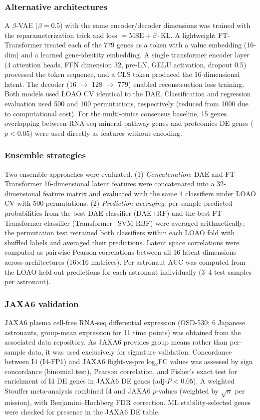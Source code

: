 \documentclass[11pt,a4paper]{article}
\begin{document}
\subsubsection{Alternative architectures}

A $\beta$-VAE ($\beta = 0.5$) with the same encoder/decoder dimensions was trained with the reparameterization trick and loss $= \text{MSE} + \beta \cdot \text{KL}$. A lightweight FT-Transformer treated each of the 779 genes as a token with a value embedding (16-dim) and a learned gene-identity embedding. A single transformer encoder layer (4 attention heads, FFN dimension 32, pre-LN, GELU activation, dropout 0.5) processed the token sequence, and a CLS token produced the 16-dimensional latent. The decoder (16 $\to$ 128 $\to$ 779) enabled reconstruction loss training. Both models used LOAO CV identical to the DAE. Classification and regression evaluation used 500 and 100 permutations, respectively (reduced from 1000 due to computational cost). For the multi-omics consensus baseline, 15 genes overlapping between RNA-seq mineral-pathway genes and proteomics DE genes ($p < 0.05$) were used directly as features without encoding.

\subsubsection{Ensemble strategies}

Two ensemble approaches were evaluated. (1) \textit{Concatenation}: DAE and FT-Transformer 16-dimensional latent features were concatenated into a 32-dimensional feature matrix and evaluated with the same 4 classifiers under LOAO CV with 500 permutations. (2) \textit{Prediction averaging}: per-sample predicted probabilities from the best DAE classifier (DAE+RF) and the best FT-Transformer classifier (Transformer+SVM-RBF) were averaged arithmetically; the permutation test retrained both classifiers within each LOAO fold with shuffled labels and averaged their predictions. Latent space correlations were computed as pairwise Pearson correlations between all 16 latent dimensions across architectures (16$\times$16 matrices). Per-astronaut AUC was computed from the LOAO held-out predictions for each astronaut individually (3--4 test samples per astronaut).

\subsubsection{JAXA6 validation}

JAXA6 plasma cell-free RNA-seq differential expression (OSD-530; 6 Japanese astronauts, group-mean expression for 11 time points) was obtained from the associated data repository. As JAXA6 provides group means rather than per-sample data, it was used exclusively for signature validation. Concordance between I4 (I4-FP1) and JAXA6 flight-vs-pre log$_2$FC values was assessed by sign concordance (binomial test), Pearson correlation, and Fisher's exact test for enrichment of I4 DE genes in JAXA6 DE genes (adj-$P < 0.05$). A weighted Stouffer meta-analysis combined I4 and JAXA6 $p$-values (weighted by $\sqrt{n}$ per mission), with Benjamini--Hochberg FDR correction. ML stability-selected genes were checked for presence in the JAXA6 DE table.
\end{document}
